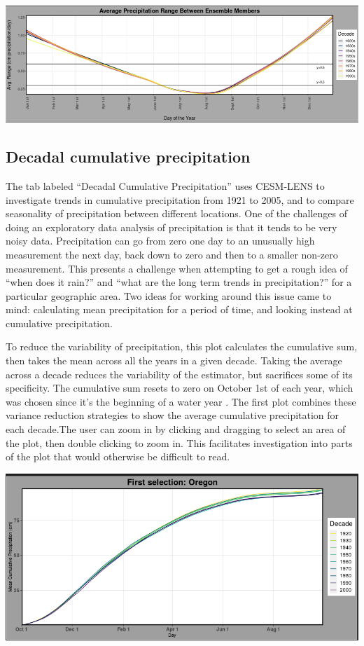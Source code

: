 \documentclass[10pt,letterpaper]{article}
\begin{document}
\begin{center}
  \includegraphics[width = .9\textwidth]{graphics/ensemble_members_top_figure.png}
\end{center}


\subsection*{Decadal cumulative precipitation}

The tab labeled “Decadal Cumulative Precipitation” uses CESM-LENS to investigate trends in cumulative precipitation from 1921 to 2005, and to compare seasonality of precipitation between different locations. One of the challenges of doing an exploratory data analysis of precipitation is that it tends to be very noisy data. Precipitation can go from zero one day to an unusually high measurement the next day, back down to zero and then to a smaller non-zero measurement. This presents a challenge when attempting to get a rough idea of “when does it rain?” and “what are the long term trends in precipitation?” for a particular geographic area. Two ideas for working around this issue came to mind: calculating mean precipitation for a period of time, and looking instead at cumulative precipitation.

To reduce the variability of precipitation, this plot calculates the cumulative sum, then takes the mean across all the years in a given decade. Taking the average across a decade reduces the variability of the estimator, but sacrifices some of its specificity. The cumulative sum resets to zero on October 1st of each year, which was chosen since it’s the beginning of a water year \cite{usgs}. The first plot combines these variance reduction strategies to show the average cumulative precipitation for each decade.The user can zoom in by clicking and dragging to select an area of the plot, then double clicking to zoom in. This facilitates investigation into parts of the plot that would otherwise be difficult to read.

\begin{center}
  \includegraphics[width = .8\textwidth]{graphics/cumulative}
\end{center}
\end{document}
